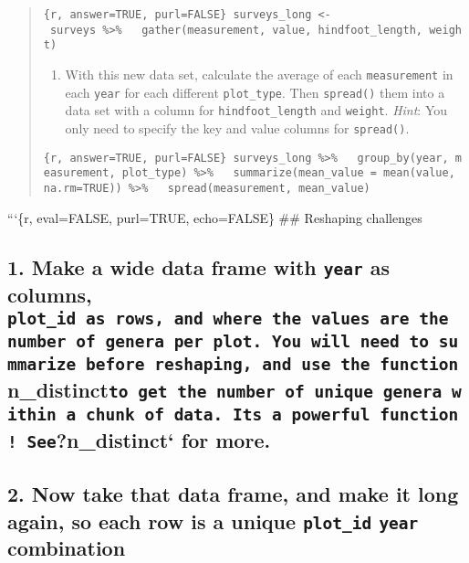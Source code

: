 \documentclass[]{article}
\providecommand{\tightlist}{%
  \setlength{\itemsep}{0pt}\setlength{\parskip}{0pt}}
\begin{document}
\begin{quote}
\texttt{\{r,\ answer=TRUE,\ purl=FALSE\}\ surveys\_long\ \textless{}-\ surveys\ \%\textgreater{}\%\ \ \ gather(measurement,\ value,\ hindfoot\_length,\ weight)}

\begin{enumerate}
\def\labelenumi{\arabic{enumi}.}
\setcounter{enumi}{3}
\tightlist
\item
  With this new data set, calculate the average of each
  \texttt{measurement} in each \texttt{year} for each different
  \texttt{plot\_type}. Then \texttt{spread()} them into a data set with
  a column for \texttt{hindfoot\_length} and \texttt{weight}.
  \emph{Hint}: You only need to specify the key and value columns for
  \texttt{spread()}.
\end{enumerate}

\texttt{\{r,\ answer=TRUE,\ purl=FALSE\}\ surveys\_long\ \%\textgreater{}\%\ \ \ group\_by(year,\ measurement,\ plot\_type)\ \%\textgreater{}\%\ \ \ summarize(mean\_value\ =\ mean(value,\ na.rm=TRUE))\ \%\textgreater{}\%\ \ \ spread(measurement,\ mean\_value)}
\end{quote}

```\{r, eval=FALSE, purl=TRUE, echo=FALSE\} \#\# Reshaping challenges

\subsection{\texorpdfstring{1. Make a wide data frame with \texttt{year}
as columns,
\texttt{plot\_id\textasciigrave{}\textasciigrave{}\ as\ rows,\ and\ where\ the\ values\ are\ the\ number\ of\ genera\ per\ plot.\ You\ will\ need\ to\ summarize\ before\ reshaping,\ and\ use\ the\ function}n\_distinct\texttt{to\ get\ the\ number\ of\ unique\ genera\ within\ a\ chunk\ of\ data.\ It\textquotesingle{}s\ a\ powerful\ function!\ See}?n\_distinct`
for
more.}{1. Make a wide data frame with year as columns, plot\_id`` as rows, and where the values are the number of genera per plot. You will need to summarize before reshaping, and use the functionn\_distinctto get the number of unique genera within a chunk of data. It's a powerful function! See?n\_distinct` for more.}}\label{make-a-wide-data-frame-with-year-as-columns-plot_id-as-rows-and-where-the-values-are-the-number-of-genera-per-plot.-you-will-need-to-summarize-before-reshaping-and-use-the-functionn_distinctto-get-the-number-of-unique-genera-within-a-chunk-of-data.-its-a-powerful-function-seen_distinct-for-more.}

\subsection{\texorpdfstring{2. Now take that data frame, and make it
long again, so each row is a unique \texttt{plot\_id} \texttt{year}
combination}{2. Now take that data frame, and make it long again, so each row is a unique plot\_id year combination}}\label{now-take-that-data-frame-and-make-it-long-again-so-each-row-is-a-unique-plot_id-year-combination}
\end{document}
